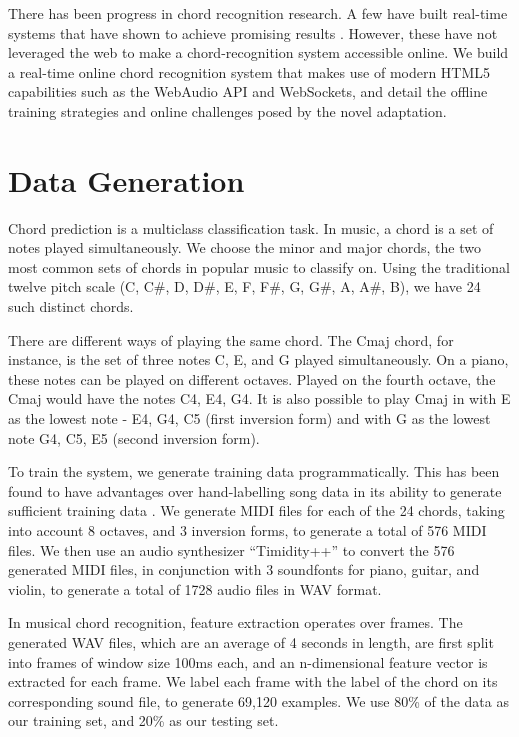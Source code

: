 \documentclass{article}
\begin{document}
There has been progress in chord recognition research. A few have built
real-time systems that have shown to achieve promising results \cite{fujishima,
cho}. However, these have not leveraged the web to make a chord-recognition
system accessible online. We build a real-time online chord recognition system
that makes use of modern HTML5 capabilities such as the WebAudio API and
WebSockets, and detail the offline training strategies and online challenges
posed by the novel adaptation.

\section{Data Generation}
Chord prediction is a multiclass classification task. In music, a chord
is a set of notes played simultaneously. We choose the minor and
major chords, the two most common sets of chords in popular music to classify
on. Using the traditional twelve pitch scale (C, C\#, D, D\#, E, F, F\#, G, G\#,
A, A\#, B), we have 24 such distinct chords.

There are different ways of playing the same chord. The Cmaj chord, for
instance, is the set of three notes C, E, and G played simultaneously. On a
piano, these notes can be played on different octaves. Played on the fourth
octave, the Cmaj would have the notes C4, E4, G4. It is also possible to play
Cmaj in with E as the lowest note - E4, G4, C5 (first inversion form) and with G
as the lowest note G4, C5, E5 (second inversion form).

To train the system, we generate training data programmatically. This has been found to have advantages over hand-labelling song data in its ability to generate sufficient training data \cite{lee}. We generate MIDI files for each of the 24 chords,
taking into account 8 octaves, and 3 inversion forms, to generate a total of 576
MIDI files. We then use an audio synthesizer ``Timidity++'' to convert the 576
generated MIDI files, in conjunction with 3 soundfonts for piano, guitar, and
violin, to generate a total of 1728 audio files in WAV format.

In musical chord recognition, feature extraction operates over frames. The
generated WAV files, which are an average of 4 seconds in length, are first
split into frames of window size 100ms each, and an n-dimensional feature vector
is extracted for each frame. We label each frame with the label of the chord on
its corresponding sound file, to generate 69,120 examples. We use 80\% of the
data as our training set, and 20\% as our testing set.
\end{document}
